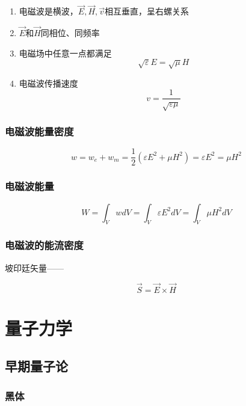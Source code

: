 \documentclass{ctexart}
\begin{document}
\begin{enumerate}
	\item 电磁波是横波，$\vec{E},\vec{H},\vec{v}$相互垂直，呈右螺关系
	\item $\vec{E}$和$\vec{H}$同相位、同频率
	\item 电磁场中任意一点都满足$$\sqrt{\varepsilon}E=\sqrt{\mu}H$$
	\item 电磁波传播速度$$v=\frac{1}{\sqrt{\varepsilon\mu}}$$
\end{enumerate}

\subsubsection{电磁波能量密度}

$$w=w_e+w_m=\frac{1}{2}(\varepsilon E^2+\mu H^2)=\varepsilon E^2=\mu H^2$$

\subsubsection{电磁波能量}

$$W=\int_V wdV=\int_V \varepsilon E^2dV=\int_V \mu H^2dV$$

\subsubsection{电磁波的能流密度}

坡印廷矢量——

$$\vec{S}=\vec{E}\times \vec{H}$$

\section{量子力学}

\subsection{早期量子论}

\subsubsection{黑体}
\end{document}
